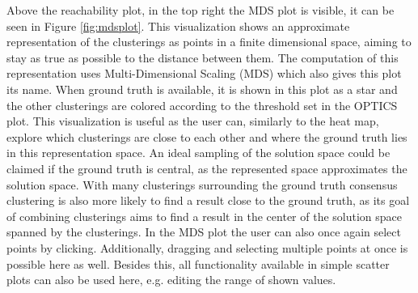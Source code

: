 \documentclass[
	a4paper,
	english,
	twoside,
	openright,               
	11pt                            
	]{report}
\begin{document}
Above the reachability plot, in the top right the MDS plot is visible, it can be seen in Figure \ref{fig:mdsplot}. This visualization shows an approximate representation of the clusterings as points in a finite dimensional space, aiming to stay as true as possible to the distance between them. The computation of this representation uses Multi-Dimensional Scaling (MDS) \cite{mds} which also gives this plot its name. When ground truth is available, it is shown in this plot as a star and the other clusterings are colored according to the threshold set in the OPTICS plot. This visualization is useful as the user can, similarly to the heat map, explore which clusterings are close to each other and where the ground truth lies in this representation space. An ideal sampling of the solution space could be claimed if the ground truth is central, as the represented space approximates the solution space. With many clusterings surrounding the ground truth consensus clustering is also more likely to find a result close to the ground truth, as its goal of combining clusterings aims to find a result in the center of the solution space spanned by the clusterings. In the MDS plot the user can also once again select points by clicking. Additionally, dragging and selecting multiple points at once is possible here as well. Besides this, all functionality available in simple scatter plots can also be used here, e.g. editing the range of shown values.
\end{document}

